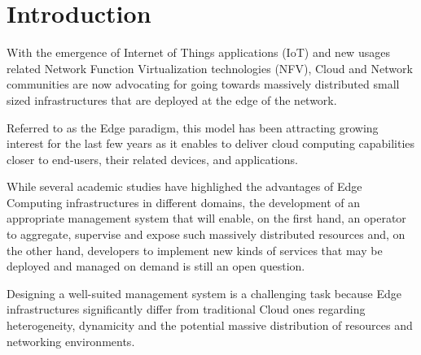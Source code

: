 
\section{Introduction}
\label{sec:intro}


With the emergence of Internet of Things applications (IoT) and new
usages related Network Function
Virtualization technologies (NFV), Cloud and Network communities are now advocating
for going towards massively distributed small sized infrastructures
that are deployed at the edge of the network.

Referred to as the Edge paradigm, this model has been attracting
growing interest for the last few years as it enables to deliver cloud
computing capabilities closer to end-users, their related devices, and
applications.

While several academic studies have highlighed the advantages of Edge
Computing infrastructures in different domains, the development of 
an appropriate management system that will enable, on the first hand, an
operator to aggregate, supervise and expose such massively distributed
resources and, on the other hand, developers to implement new kinds of services
that may be deployed and managed on demand is still an open question.

Designing a well-suited management system
is a challenging task because Edge infrastructures significantly
differ from traditional Cloud ones regarding heterogeneity,
dynamicity and the potential massive distribution of resources and
networking environments.





